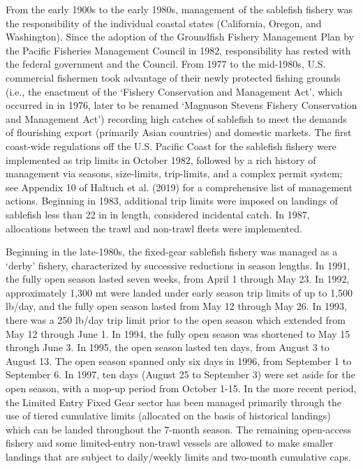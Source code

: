 \documentclass[11pt,
  english,
  a4paper,
]{article}
\begin{document}
From the early 1900s to the early 1980s, management of the sablefish fishery was the responsibility of the individual coastal states (California, Oregon, and Washington). Since the adoption of the Groundfish Fishery Management Plan by the Pacific Fisheries Management Council in 1982, responsibility has rested with the federal government and the Council. From 1977 to the mid-1980s, U.S. commercial fishermen took advantage of their newly protected fishing grounds (i.e., the enactment of the `Fishery Conservation and Management Act', which occurred in in 1976, later to be renamed `Magnuson Stevens Fishery Conservation and Management Act') recording high catches of sablefish to meet the demands of flourishing export (primarily Asian countries) and domestic markets. The first coast-wide regulations off the U.S. Pacific Coast for the sablefish fishery were implemented as trip limits in October 1982, followed by a rich history of management via seasons, size-limits, trip-limits, and a complex permit system; see Appendix 10 of {Haltuch et al. (2019)\leavevmode\tagmcend\tagstructend} for a comprehensive list of management actions. Beginning in 1983, additional trip limits were imposed on landings of sablefish less than 22 in in length, considered incidental catch. In 1987, allocations between the trawl and non-trawl fleets were implemented.

\leavevmode\tagmcend\tagstructend\par


Beginning in the late-1980s, the fixed-gear sablefish fishery was managed as a `derby' fishery, characterized by successive reductions in season lengths. In 1991, the fully open season lasted seven weeks, from April 1 through May 23. In 1992, approximately 1,300 mt were landed under early season trip limits of up to 1,500 lb/day, and the fully open season lasted from May 12 through May 26. In 1993, there was a 250 lb/day trip limit prior to the open season which extended from May 12 through June 1. In 1994, the fully open season was shortened to May 15 through June 3. In 1995, the open season lasted ten days, from August 3 to August 13. The open season spanned only six days in 1996, from September 1 to September 6. In 1997, ten days (August 25 to September 3) were set aside for the open season, with a mop-up period from October 1-15. In the more recent period, the Limited Entry Fixed Gear sector has been managed primarily through the use of tiered cumulative limits (allocated on the basis of historical landings) which can be landed throughout the 7-month season. The remaining open-access fishery and some limited-entry non-trawl vessels are allowed to make smaller landings that are subject to daily/weekly limits and two-month cumulative caps.
\end{document}
